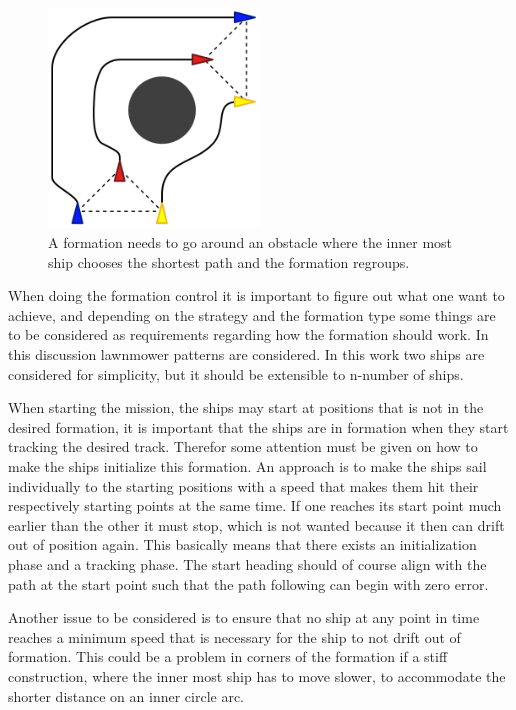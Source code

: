 \begin{figure}[htbp]
	\centering
	\includegraphics[width=0.5\textwidth]{fig/form_avoid}
	\caption{A formation needs to go around an obstacle where the inner most ship chooses the shortest path and the formation regroups.}
	\label{fig:avoid}
\end{figure}

When doing the formation control it is important to figure out what one
want to achieve, and depending on the strategy and the formation type
some things are to be considered as requirements regarding how the
formation should work. In this discussion lawnmower patterns are considered. In this work two ships are considered for simplicity, but it should be extensible to n-number of ships.

When starting the mission, the ships may start at positions that
is not in the desired formation, it is important that the ships are in
formation when they start tracking the desired track. Therefor some
attention must be given on how to make the ships initialize this
formation. An approach is to make the ships sail individually to the
starting positions with a speed that makes them hit their respectively starting points at
the same time. If one reaches its start point much earlier
than the other it must stop, which is not wanted because it then can
drift out of position again. This basically means that there exists an initialization
phase and a tracking phase. The start heading should of
course align with the path at the start point such that the path following can begin with zero error.

Another issue to be considered is to ensure that no ship at
any point in time reaches a minimum speed that is necessary for the
ship to not drift out of formation. This could be a problem in corners
of the formation if a stiff construction, where the inner most ship
has to move slower, to accommodate the shorter distance on an inner
circle arc.

